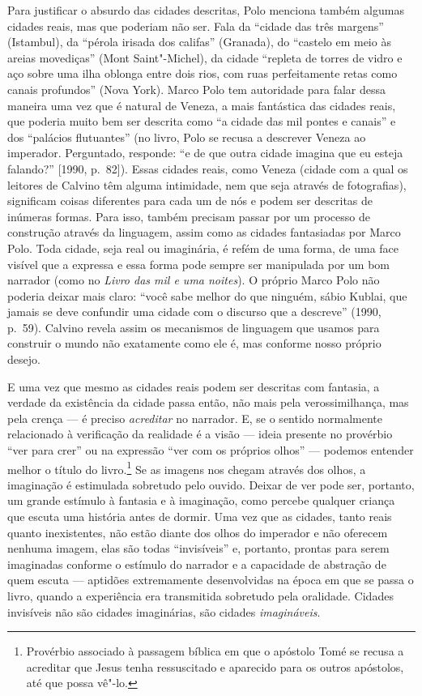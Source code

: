Para justificar o absurdo das cidades descritas, Polo menciona também
algumas cidades reais, mas que poderiam não ser. Fala da ``cidade das
três margens'' (Istambul), da ``pérola irisada dos califas'' (Granada),
do ``castelo em meio às areias movediças'' (Mont Saint"-Michel), da
cidade ``repleta de torres de vidro e aço sobre uma ilha oblonga entre
dois rios, com ruas perfeitamente retas como canais profundos'' (Nova
York). Marco Polo tem autoridade para falar dessa maneira uma vez que é
natural de Veneza, a mais fantástica das cidades reais, que poderia
muito bem ser descrita como ``a cidade das mil pontes e canais'' e dos
``palácios flutuantes'' (no livro, Polo se recusa a descrever Veneza ao
imperador. Perguntado, responde: ``e de que outra cidade imagina que eu
esteja falando?'' {[}1990, p.~82{]}). Essas cidades reais, como Veneza
(cidade com a qual os leitores de Calvino têm alguma intimidade, nem que
seja através de fotografias), significam coisas diferentes para cada um
de nós e podem ser descritas de inúmeras formas. Para isso, também
precisam passar por um processo de construção através da linguagem,
assim como as cidades fantasiadas por Marco Polo. Toda cidade, seja real
ou imaginária, é refém de uma forma, de uma face visível que a expressa
e essa forma pode sempre ser manipulada por um bom narrador (como no
\emph{Livro das mil e uma noites}). O próprio Marco Polo não poderia
deixar mais claro: ``você sabe melhor do que ninguém, sábio Kublai, que
jamais se deve confundir uma cidade com o discurso que a descreve''
(1990, p.~59). Calvino revela assim os mecanismos de linguagem que
usamos para construir o mundo não exatamente como ele é, mas conforme
nosso próprio desejo.

E uma vez que mesmo as cidades reais podem ser descritas com fantasia, a
verdade da existência da cidade passa então, não mais pela
verossimilhança, mas pela crença --- é preciso \emph{acreditar} no
narrador. E, se o sentido normalmente relacionado à verificação da
realidade é a visão --- ideia presente no provérbio ``ver para crer'' ou
na expressão ``ver com os próprios olhos'' --- podemos entender melhor o
título do livro.\footnote{Provérbio associado à passagem bíblica em que
  o apóstolo Tomé se recusa a acreditar que Jesus tenha ressuscitado e
  aparecido para os outros apóstolos, até que possa vê"-lo.} Se as
imagens nos chegam através dos olhos, a imaginação é estimulada
sobretudo pelo ouvido. Deixar de ver pode ser, portanto, um grande
estímulo à fantasia e à imaginação, como percebe qualquer criança que
escuta uma história antes de dormir. Uma vez que as cidades, tanto reais
quanto inexistentes, não estão diante dos olhos do imperador e não
oferecem nenhuma imagem, elas são todas ``invisíveis'' e, portanto,
prontas para serem imaginadas conforme o estímulo do narrador e a
capacidade de abstração de quem escuta --- aptidões extremamente
desenvolvidas na época em que se passa o livro, quando a experiência era
transmitida sobretudo pela oralidade. Cidades invisíveis não são cidades
imaginárias, são cidades \emph{imagináveis}.

